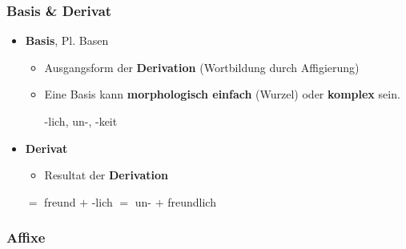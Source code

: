 \begin{frame}
\frametitle{Basis \& Derivat}

\begin{itemize}
	\item \textbf{Basis}, Pl. Basen \citep[vgl.][]{Eins16a}
	
	\begin{itemize}
		\item Ausgangsform der \textbf{Derivation} (Wortbildung durch Affigierung)
		\item Eine Basis kann \textbf{morphologisch einfach} (Wurzel) oder \textbf{komplex} sein.
		
		\ea {}-lich, un-, -keit
		\z 

	\end{itemize}

	\item \textbf{Derivat}
	\begin{itemize}
		\item Resultat der \textbf{Derivation}
	\end{itemize}
	
	\ea 
		\ea {} $=$ freund $+$ -lich
		\ex {} $=$ un- $+$ freundlich
		\z 
	\z 

\end{itemize}

\end{frame}


\subsubsection{Affixe}


